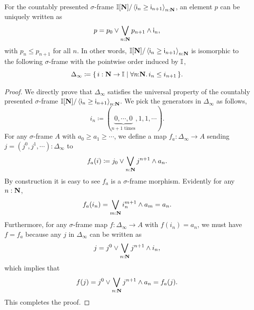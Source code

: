 \begin{lemma}\label{app:normalsigma}
  For the countably presented $\sigma$-frame $\mathbb{I}[\mathbf{N}]/\left\langle\mathsf{i}_n \ge \mathsf{i}_{n+1}\right\rangle_{n:\mathbf{N}}$, an element $p$ can be uniquely written as 
  \[ p = p_0 \vee \bigvee_{n:\N} p_{n+1} \wedge \ms{i}_n\text{,} \]
  with $p_n \le p_{n+1}$ for all $n$. In other words, $\mathbb{I}[\mathbf{N}]/\left\langle\mathsf{i}_n \ge \mathsf{i}_{n+1}\right\rangle_{n:\mathbf{N}}$ is isomorphic to the following $\sigma$-frame with the pointwise order induced by $\mathbb{I}$,
  \[ \Delta_\infty \coloneq \scomp{i : \N \to \I}{\fa n\N i_n \le i_{n+1}}\text{.} \]
\end{lemma}
\begin{proof}
  We directly prove that $\Delta_\infty$ satisfies the universal property of the countably presented $\sigma$-frame $\mathbb{I}[\mathbf{N}]/\left\langle\mathsf{i}_n \ge \mathsf{i}_{n+1}\right\rangle_{n:\mathbf{N}}$. We pick the generators in $\Delta_\infty$ as follows,
  \[ i_n \coloneq (\underbrace{0,\cdots,0}_{n+1 \text{ times}},1,1,\cdots)\text{.} \]
  For any $\sigma$-frame $A$ with $a_0 \ge a_1 \ge \cdots$, we define a map $f_a : \Delta_\infty \to A$ sending $j = (j^0,j^1,\cdots) : \Delta_\infty$ to
  \[ f_a(i) \coloneq j_0 \vee \bigvee_{n:\N} j^{n+1} \wedge a_{n}\text{.} \]
  By construction it is easy to see $f_a$ is a $\sigma$-frame morphism. Evidently for any $n : \mathbf{N}$, 
  \[ f_a(i_n) = \bigvee_{m:\N} i_n^{m+1} \wedge a_m = a_n\text{.} \]
  Furthermore, for any $\sigma$-frame map $f \colon \Delta_\infty \to A$ with $f(i_n) = a_n$, we must have $f = f_a$ because any $j$ in $\Delta_\infty$ can be written as
  \[ j = j^0 \vee \bigvee_{n:\N} j^{n+1} \wedge i_n\text{,} \]
  which implies that
  \[ f(j) = j^0 \vee \bigvee_{n:\N}j^{n+1} \wedge a_n = f_a(j)\text{.} \]
  This completes the proof.
\end{proof}

